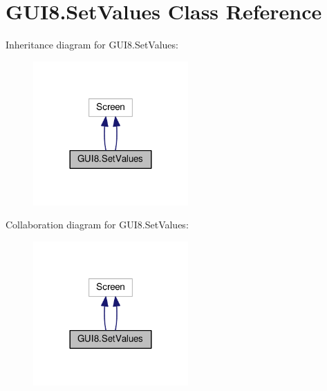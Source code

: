 \hypertarget{classGUI8_1_1SetValues}{}\section{G\+U\+I8.\+Set\+Values Class Reference}
\label{classGUI8_1_1SetValues}


Inheritance diagram for G\+U\+I8.\+Set\+Values\+:\nopagebreak
\begin{figure}[H]
\begin{center}
\leavevmode
\includegraphics[width=168pt]{classGUI8_1_1SetValues__inherit__graph}
\end{center}
\end{figure}


Collaboration diagram for G\+U\+I8.\+Set\+Values\+:\nopagebreak
\begin{figure}[H]
\begin{center}
\leavevmode
\includegraphics[width=168pt]{classGUI8_1_1SetValues__coll__graph}
\end{center}
\end{figure}
